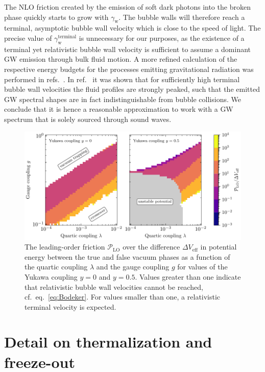 The \ac{NLO} friction created by the emission of soft dark photons into the broken phase quickly starts to grow with $\gamma_\text{w}$. The bubble walls will therefore reach a terminal, asymptotic bubble wall velocity which is close to the speed of light. The precise value of $\gamma_\text{w}^\text{terminal}$ is unnecessary for our purposes, as the existence of a terminal yet relativistic bubble wall velocity is sufficient to assume a dominant \ac{GW} emission through bulk fluid motion.  A more refined calculation of the respective energy budgets for the processes emitting gravitational radiation was performed
in refs.~\cite{Lewicki:2022pdb,Ellis:2020nnr, Ellis:2019oqb}. In ref.~\cite{Lewicki:2022pdb} it was shown that for sufficiently high terminal bubble wall velocities the fluid profiles are strongly peaked, such that the emitted \ac{GW} spectral shapes are in fact indistinguishable from bubble collisions. We conclude that it is hence a reasonable approximation to work with a \ac{GW} spectrum that is solely sourced through sound waves.

\begin{figure}[t]
	\centering
	\includegraphics[width=\linewidth]{thesisplots/lisa/thesis_LISA_13}
	\caption{The leading-order friction $\mathcal{P}_\text{LO}$ over the difference $\Delta V_\text{eff}$ in potential energy between the true and false vacuum phases as a function of the quartic coupling $\lambda$ and the gauge coupling $g$ for values of the Yukawa coupling $y = 0$ and $y = 0.5$. Values greater than one indicate that relativistic bubble wall velocities cannot be reached, cf.~eq.~\eqref{eq:Bodeker}. For values smaller than one, a relativistic terminal velocity is expected.}
	\label{fig:verifyvw}
\end{figure}

\section{Detail on thermalization and freeze-out}
\label{app:thermalisation}


